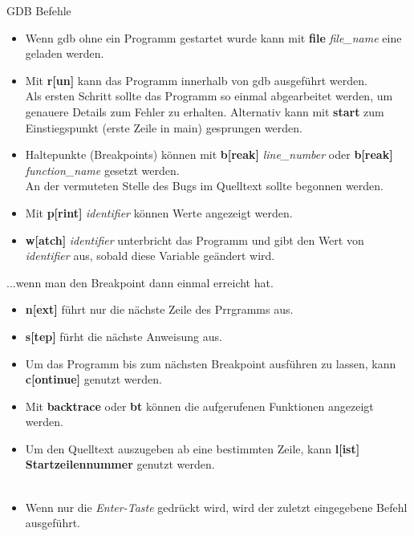 \begin{frame}{GDB Befehle}
	\begin{itemize}
		\item Wenn gdb ohne ein Programm gestartet wurde kann mit \textbf{file}  \textit{file\_name} eine geladen werden.
		\item Mit \textbf{r[un]} kann das Programm innerhalb von gdb ausgeführt werden.\\
		Als ersten Schritt sollte das Programm so einmal abgearbeitet werden, um genauere Details zum Fehler zu erhalten. Alternativ kann mit \textbf{start} zum Einstiegspunkt (erste Zeile in main) gesprungen werden.
		\item Haltepunkte (Breakpoints) können mit \textbf{b[reak]} \textit{line\_number} oder \textbf{b[reak]} \textit{function\_name} gesetzt werden.\\
		An der vermuteten Stelle des Bugs im Quelltext sollte begonnen werden.
		\item Mit \textbf{p[rint]} \textit{identifier} können Werte angezeigt werden.
		\item \textbf{w[atch]} \textit{identifier} unterbricht das Programm und gibt den Wert von \textit{identifier} aus, sobald diese Variable geändert wird.
	\end{itemize}
\end{frame}


\begin{frame}{...wenn man den Breakpoint dann einmal erreicht hat.}
	\begin{itemize}
		\item \textbf{n[ext]} f\"uhrt nur die nächste Zeile des Prrgramms aus.
		\item \textbf{s[tep]} f\"urht die nächste Anweisung aus.
		\item Um das Programm bis zum n\"achsten Breakpoint ausführen zu lassen, kann \textbf{c[ontinue]} genutzt werden.
		\item Mit \textbf{backtrace} oder \textbf{bt} k\"onnen die aufgerufenen Funktionen angezeigt werden.\\
		\item Um den Quelltext auszugeben ab eine bestimmten Zeile, kann \textbf{l[ist] Startzeilennummer} genutzt werden.
		\\\ \\
		\item Wenn nur die \textit{Enter-Taste} gedrückt wird, wird der zuletzt eingegebene Befehl ausgeführt.
	\end{itemize}
\end{frame}

